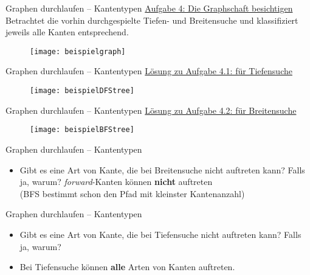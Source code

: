 \begin{frame}{Graphen durchlaufen – Kantentypen}
	\underline{Aufgabe 4: Die Graphschaft besichtigen} \\
	Betrachtet die vorhin durchgespielte Tiefen- und Breitensuche und klassifiziert jeweils alle Kanten entsprechend.
	\begin{figure}[htp]
		\centering
		\texttt{[image: beispielgraph]}
	\end{figure}
\end{frame}

\begin{frame}{Graphen durchlaufen – Kantentypen}
	\underline{Lösung zu Aufgabe 4.1: für Tiefensuche} \\
	\forcenewline
	\forcenewline
	\begin{figure}[htp]
		\centering
		\texttt{[image: beispielDFStree]}
	\end{figure}
\end{frame}

\begin{frame}{Graphen durchlaufen – Kantentypen}
	\underline{Lösung zu Aufgabe 4.2: für Breitensuche} \\
	\forcenewline
	\forcenewline
	\begin{figure}[htp]
		\centering
		\texttt{[image: beispielBFStree]}
	\end{figure}
\end{frame}

\begin{frame}{Graphen durchlaufen – Kantentypen}
	\begin{itemize}
		\item Gibt es eine Art von Kante, die bei Breitensuche nicht auftreten kann? Falls ja, warum?
		\pause
		\implitem \textit{forward}-Kanten können \textbf{nicht} auftreten \\
		(BFS bestimmt schon den Pfad mit kleinster Kantenanzahl)
	\end{itemize}
\end{frame}

\begin{frame}{Graphen durchlaufen – Kantentypen}
	\begin{itemize}
		\item Gibt es eine Art von Kante, die bei Tiefensuche nicht auftreten kann? Falls ja, warum?
		\pause
		\item Bei Tiefensuche können \textbf{alle} Arten von Kanten auftreten.
	\end{itemize}
\end{frame}

